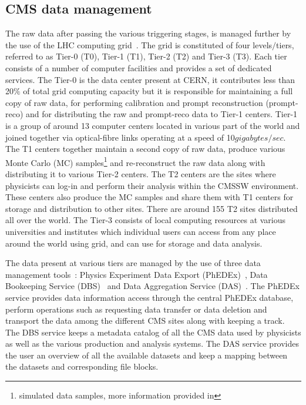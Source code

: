 \subsection{CMS data management}
The raw data after passing the various triggering stages, is managed further by the use of the LHC computing grid~\cite{Eck:840543}.
The grid is constituted of four levels$/$tiers, referred to as Tier-0 (T0), Tier-1 (T1), Tier-2 (T2) and Tier-3 (T3).
Each tier consists of a number of computer facilities and provides a set of dedicated services. 
The Tier-0 is the data center present at CERN, it contributes less than 20$\%$ of total grid computing capacity but it is responsible for maintaining a full copy
of raw data, for performing calibration and prompt reconstruction (prompt-reco) and for distributing the raw and prompt-reco data to Tier-1 centers. 
Tier-1 is a group of around 13 computer centers located in various part of the world and
joined together via optical-fibre links operating at a speed of 10$\unit{gigabytes/sec}$.
The T1 centers together maintain a second copy of raw
data, produce various Monte Carlo (MC) samples\footnote{simulated data samples, more information provided in \chap{\ref{ch:chapter3}}}
and re-reconstruct the raw data along with distributing it to various Tier-2 centers.
The T2 centers are the sites where physicists can log-in and perform their analysis within the CMSSW environment. These centers also produce the MC samples
and share them with T1 centers for storage and distribution to other sites. There are around 155 T2 sites distributed all over the world. 
The Tier-3 consists of local computing resources at various universities and institutes which individual users can access from any place around the world using grid,
and can use for storage and data analysis. 

The data present at various tiers are managed by the use of three data management tools~\cite{Giffels:2014tfa}:
Physics Experiment Data Export (PhEDEx)~\cite{Egeland:2008zz, Egeland:1196164}, Data Bookeeping Service (DBS)~\cite{Afaq:2007zz}
and Data Aggregation Service (DAS)~\cite{KUZNETSOV20101535}. The PhEDEx service provides data information access through the central PhEDEx database,
perform operations such as requesting data transfer or data deletion and transport the data among the different CMS sites along with keeping a track.
The DBS service keeps a metadata catalog of all the CMS data used by physicists as well as
the various production and analysis systems. The DAS service provides the user an overview of all the available datasets and keep a mapping between the datasets
and corresponding file blocks.
